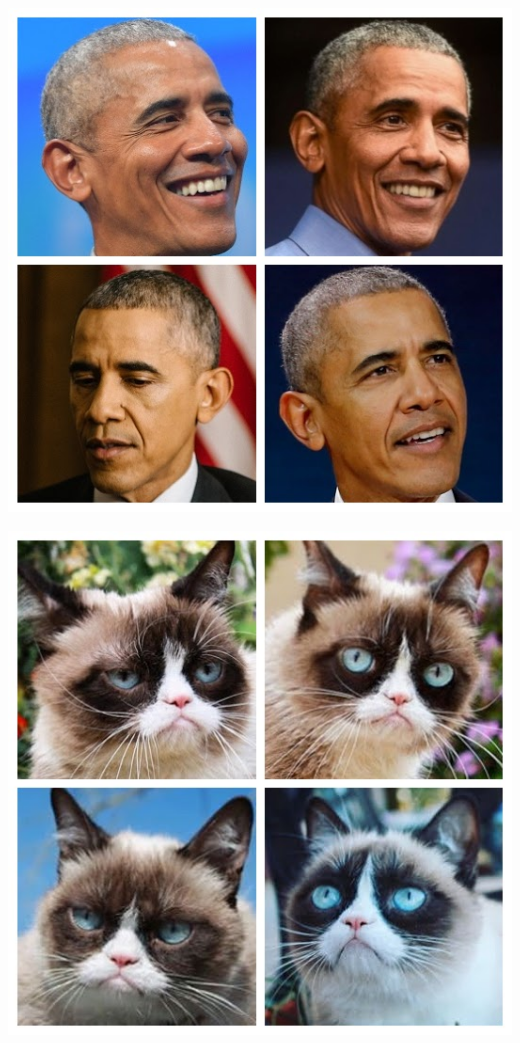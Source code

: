 \documentclass[12pt]{article}
\begin{document}
\begin{minipage}[t]{0.2\textwidth} 
	\includegraphics[width=1\textwidth]{Images/obama.jpg}
\end{minipage}
\begin{minipage}[t]{0.2\textwidth} 
	\includegraphics[width=1\textwidth]{Images/grumpy.jpg}
\end{minipage}
\end{document}
